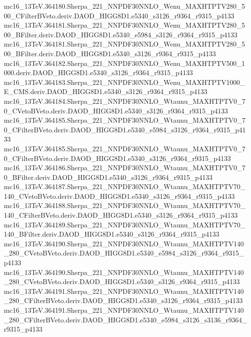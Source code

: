mc16_13TeV.364180.Sherpa_221_NNPDF30NNLO_Wenu_MAXHTPTV280_500_CFilterBVeto.deriv.DAOD_HIGG8D1.e5340_s3126_r9364_r9315_p4133 \\
mc16_13TeV.364181.Sherpa_221_NNPDF30NNLO_Wenu_MAXHTPTV280_500_BFilter.deriv.DAOD_HIGG8D1.e5340_e5984_s3126_r9364_r9315_p4133 \\
mc16_13TeV.364181.Sherpa_221_NNPDF30NNLO_Wenu_MAXHTPTV280_500_BFilter.deriv.DAOD_HIGG8D1.e5340_s3126_r9364_r9315_p4133 \\
mc16_13TeV.364182.Sherpa_221_NNPDF30NNLO_Wenu_MAXHTPTV500_1000.deriv.DAOD_HIGG8D1.e5340_s3126_r9364_r9315_p4133 \\
mc16_13TeV.364183.Sherpa_221_NNPDF30NNLO_Wenu_MAXHTPTV1000_E_CMS.deriv.DAOD_HIGG8D1.e5340_s3126_r9364_r9315_p4133 \\
mc16_13TeV.364184.Sherpa_221_NNPDF30NNLO_Wtaunu_MAXHTPTV0_70_CVetoBVeto.deriv.DAOD_HIGG8D1.e5340_s3126_r9364_r9315_p4133 \\
mc16_13TeV.364185.Sherpa_221_NNPDF30NNLO_Wtaunu_MAXHTPTV0_70_CFilterBVeto.deriv.DAOD_HIGG8D1.e5340_e5984_s3126_r9364_r9315_p4133 \\
mc16_13TeV.364185.Sherpa_221_NNPDF30NNLO_Wtaunu_MAXHTPTV0_70_CFilterBVeto.deriv.DAOD_HIGG8D1.e5340_s3126_r9364_r9315_p4133 \\
mc16_13TeV.364186.Sherpa_221_NNPDF30NNLO_Wtaunu_MAXHTPTV0_70_BFilter.deriv.DAOD_HIGG8D1.e5340_s3126_r9364_r9315_p4133 \\
mc16_13TeV.364187.Sherpa_221_NNPDF30NNLO_Wtaunu_MAXHTPTV70_140_CVetoBVeto.deriv.DAOD_HIGG8D1.e5340_s3126_r9364_r9315_p4133 \\
mc16_13TeV.364188.Sherpa_221_NNPDF30NNLO_Wtaunu_MAXHTPTV70_140_CFilterBVeto.deriv.DAOD_HIGG8D1.e5340_s3126_r9364_r9315_p4133 \\
mc16_13TeV.364189.Sherpa_221_NNPDF30NNLO_Wtaunu_MAXHTPTV70_140_BFilter.deriv.DAOD_HIGG8D1.e5340_s3126_r9364_r9315_p4133 \\
mc16_13TeV.364190.Sherpa_221_NNPDF30NNLO_Wtaunu_MAXHTPTV140_280_CVetoBVeto.deriv.DAOD_HIGG8D1.e5340_e5984_s3126_r9364_r9315_p4133 \\
mc16_13TeV.364190.Sherpa_221_NNPDF30NNLO_Wtaunu_MAXHTPTV140_280_CVetoBVeto.deriv.DAOD_HIGG8D1.e5340_s3126_r9364_r9315_p4133 \\
mc16_13TeV.364191.Sherpa_221_NNPDF30NNLO_Wtaunu_MAXHTPTV140_280_CFilterBVeto.deriv.DAOD_HIGG8D1.e5340_s3126_r9364_r9315_p4133 \\
mc16_13TeV.364191.Sherpa_221_NNPDF30NNLO_Wtaunu_MAXHTPTV140_280_CFilterBVeto.deriv.DAOD_HIGG8D1.e5340_e5984_s3126_s3136_r9364_r9315_p4133 \\
